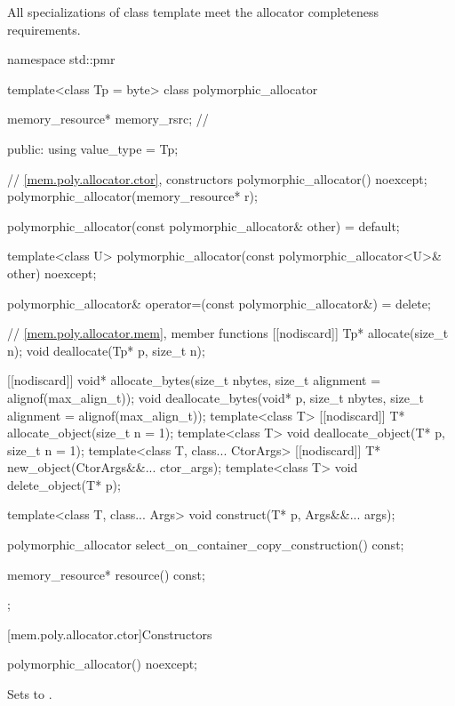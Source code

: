 \pnum
All specializations of class template 
meet the allocator completeness requirements.

%
%
\begin{codeblock}
namespace std::pmr {
  template<class Tp = byte> class polymorphic_allocator {
    memory_resource* memory_rsrc;       // \expos

  public:
    using value_type = Tp;

    // \ref{mem.poly.allocator.ctor}, constructors
    polymorphic_allocator() noexcept;
    polymorphic_allocator(memory_resource* r);

    polymorphic_allocator(const polymorphic_allocator& other) = default;

    template<class U>
      polymorphic_allocator(const polymorphic_allocator<U>& other) noexcept;

    polymorphic_allocator& operator=(const polymorphic_allocator&) = delete;

    // \ref{mem.poly.allocator.mem}, member functions
    [[nodiscard]] Tp* allocate(size_t n);
    void deallocate(Tp* p, size_t n);

    [[nodiscard]] void* allocate_bytes(size_t nbytes, size_t alignment = alignof(max_align_t));
    void deallocate_bytes(void* p, size_t nbytes, size_t alignment = alignof(max_align_t));
    template<class T> [[nodiscard]] T* allocate_object(size_t n = 1);
    template<class T> void deallocate_object(T* p, size_t n = 1);
    template<class T, class... CtorArgs> [[nodiscard]] T* new_object(CtorArgs&&... ctor_args);
    template<class T> void delete_object(T* p);

    template<class T, class... Args>
      void construct(T* p, Args&&... args);

    polymorphic_allocator select_on_container_copy_construction() const;

    memory_resource* resource() const;
  };
}
\end{codeblock}

[mem.poly.allocator.ctor]{Constructors}

%
\begin{itemdecl}
polymorphic_allocator() noexcept;
\end{itemdecl}

\begin{itemdescr}
\pnum
\effects
Sets  to .
\end{itemdescr}

